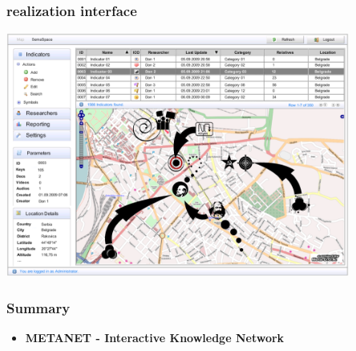 \documentclass[blue]{beamer}
\begin{document}
\frame
{
\frametitle{\textbf{realization interface}}
\includegraphics[width=0.85\textwidth]{bin/features/metamap/02_gui_metamap_admin_start_update.png}
}


\frame
{
\frametitle{\textbf{Summary}}
\begin{itemize}
\item \textbf{METANET - Interactive Knowledge Network}
\end{itemize}
}


\end{document}
